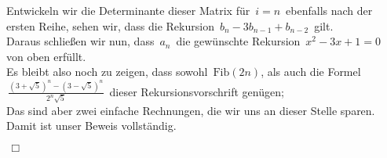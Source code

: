 Entwickeln wir die Determinante dieser Matrix für $\,i=n\,$ ebenfalls nach der ersten Reihe, sehen wir, dass die Rekursion $\,b_n-3b_{n-1} + b_{n-2}\,$ gilt.\\
Daraus schließen wir nun, dass $\,a_n\,$ die gewünschte Rekursion $\,x^2-3x+1=0\,$ von oben erfüllt.\\
Es bleibt also noch zu zeigen, dass sowohl $\,\mathrm{Fib}(2n)$,\; als auch die Formel $\,\frac{(3+\sqrt{5})^{n}-(3-\sqrt{5})^{n}}{2^{n}\sqrt{5}}\,$ dieser Rekursionsvorschrift genügen;\\ 
Das sind aber zwei einfache Rechnungen, die wir uns an dieser Stelle sparen.\\
Damit ist unser Beweis vollständig.
\begin{flushright} $\,\Box\,$ \end{flushright}
